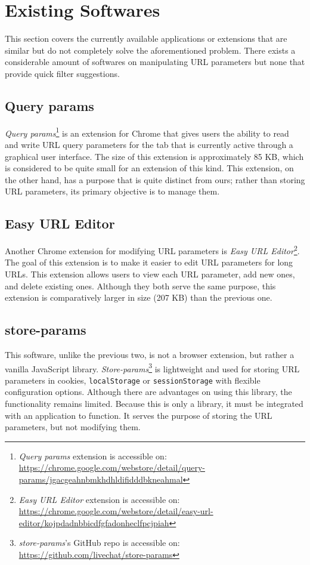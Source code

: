 \section{Existing Softwares}
This section covers the currently available applications or extensions that are similar but do not completely solve the aforementioned problem. There exists a considerable amount of softwares on manipulating URL parameters but none that provide quick filter suggestions.

\subsection*{Query params}
\emph{Query params}\footnote{\emph{Query params} extension is accessible on: \url{https://chrome.google.com/webstore/detail/query-params/jgacgeahnbmkhdhldifidddbkneahmal}} is an extension for Chrome that gives users the ability to read and write URL query parameters for the tab that is currently active through a graphical user interface. The size of this extension is approximately 85 KB, which is considered to be quite small for an extension of this kind. This extension, on the other hand, has a purpose that is quite distinct from ours; rather than storing URL parameters, its primary objective is to manage them.

\subsection*{Easy URL Editor}
Another Chrome extension for modifying URL parameters is \emph{Easy URL Editor}\footnote{\emph{Easy URL Editor} extension is accessible on: \url{https://chrome.google.com/webstore/detail/easy-url-editor/kojpdadnbbicdfgfadonheclfpcjpiah}}. The goal of this extension is to make it easier to edit URL parameters for long URLs. This extension allows users to view each URL parameter, add new ones, and delete existing ones. Although they both serve the same purpose, this extension is comparatively larger in size (207 KB) than the previous one.

\subsection*{store-params}
This software, unlike the previous two, is not a browser extension, but rather a vanilla JavaScript library. \emph{Store-params}\footnote{\emph{store-params}'s GitHub repo is accessible on: \url{https://github.com/livechat/store-params}} is lightweight and used for storing URL parameters in cookies, \texttt{localStorage} or \texttt{sessionStorage} with flexible configuration options. Although there are advantages on using this library, the functionality remains limited. Because this is only a library, it must be integrated with an application to function. It serves the purpose of storing the URL parameters, but not modifying them.

